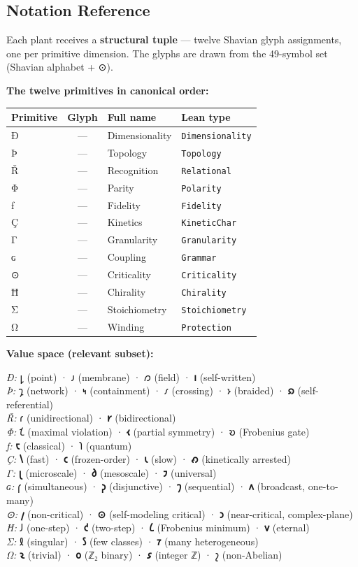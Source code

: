 \hypertarget{notation-reference}{%
\subsection{Notation Reference}\label{notation-reference}}

Each plant receives a \textbf{structural tuple} --- twelve Shavian glyph
assignments, one per primitive dimension. The glyphs are drawn from the
49-symbol set (Shavian alphabet + ⊙).

\textbf{The twelve primitives in canonical order:}

\begin{longtable}[]{@{}lcll@{}}
\toprule
Primitive & Glyph & Full name & Lean type\tabularnewline
\midrule
\endhead
Ð & --- & Dimensionality & \texttt{Dimensionality}\tabularnewline
Þ & --- & Topology & \texttt{Topology}\tabularnewline
Ř & --- & Recognition & \texttt{Relational}\tabularnewline
Φ & --- & Parity & \texttt{Polarity}\tabularnewline
ƒ & --- & Fidelity & \texttt{Fidelity}\tabularnewline
Ç & --- & Kinetics & \texttt{KineticChar}\tabularnewline
Γ & --- & Granularity & \texttt{Granularity}\tabularnewline
ɢ & --- & Coupling & \texttt{Grammar}\tabularnewline
⊙ & --- & Criticality & \texttt{Criticality}\tabularnewline
Ħ & --- & Chirality & \texttt{Chirality}\tabularnewline
Σ & --- & Stoichiometry & \texttt{Stoichiometry}\tabularnewline
Ω & --- & Winding & \texttt{Protection}\tabularnewline
\bottomrule
\end{longtable}

\textbf{Value space (relevant subset):}

\emph{Ð:} 𐑛 (point) · 𐑨 (membrane) · 𐑼 (field) · \textbf{𐑦}
(self-written)\\
\emph{Þ:} 𐑡 (network) · 𐑰 (containment) · 𐑥 (crossing) · 𐑶 (braided) ·
\textbf{𐑸} (self-referential)\\
\emph{Ř:} 𐑩 (unidirectional) · \textbf{𐑾} (bidirectional)\\
\emph{Φ:} 𐑗 (maximal violation) · \textbf{𐑬} (partial symmetry) · 𐑹
(Frobenius gate)\\
\emph{ƒ:} \textbf{𐑱} (classical) · 𐑐 (quantum)\\
\emph{Ç:} \textbf{𐑘} (fast) · \textbf{𐑤} (frozen-order) · \textbf{𐑧}
(slow) · \textbf{𐑺} (kinetically arrested)\\
\emph{Γ:} \textbf{𐑚} (microscale) · \textbf{𐑔} (mesoscale) · \textbf{𐑲}
(universal)\\
\emph{ɢ:} 𐑝 (simultaneous) · \textbf{𐑜} (disjunctive) · \textbf{𐑠}
(sequential) · \textbf{𐑵} (broadcast, one-to-many)\\
\emph{⊙:} \textbf{𐑢} (non-critical) · \textbf{⊙} (self-modeling
critical) · \textbf{𐑮} (near-critical, complex-plane)\\
\emph{Ħ:} 𐑓 (one-step) · \textbf{𐑒} (two-step) · \textbf{𐑖} (Frobenius
minimum) · \textbf{𐑫} (eternal)\\
\emph{Σ:} 𐑙 (singular) · \textbf{𐑕} (few classes) · \textbf{𐑳} (many
heterogeneous)\\
\emph{Ω:} \textbf{𐑷} (trivial) · \textbf{𐑴} (ℤ₂ binary) · \textbf{𐑭}
(integer ℤ) · 𐑟 (non-Abelian)

